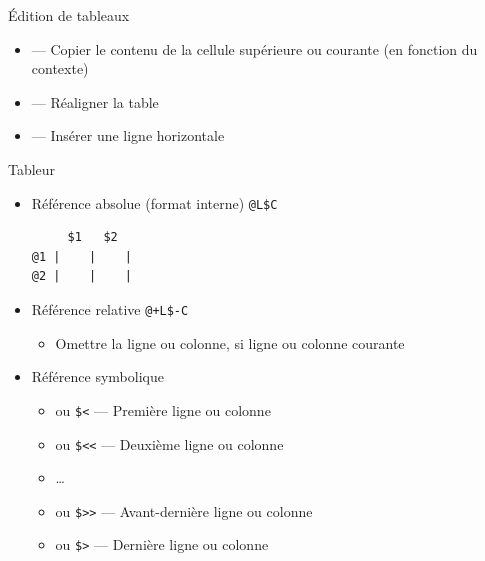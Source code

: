 \documentclass[presentation,t]{beamer}
\let\ORIkeys\keys
\renewcommand{\keys}[1]{\ORIkeys{\texttt{#1}}}
\begin{document}
\begin{frame}[label={sec:orgfe4f9b3}]{Édition de tableaux}
\begin{itemize}
\item \keys{S-RET} --- Copier le contenu de la cellule supérieure ou courante (en
fonction du contexte)
\item \keys{C-c C-c} --- Réaligner la table
\item \keys{C-c -} --- Insérer une ligne horizontale
\end{itemize}
\end{frame}

\begin{frame}[fragile,label={sec:orgc12b694}]{Tableur}
 \begin{itemize}
\item Référence absolue (format interne) \texttt{@L\$C}

\lstset{language=org,label= ,caption= ,captionpos=b,numbers=none}
\begin{lstlisting}
     $1   $2
@1 |    |    |
@2 |    |    |
\end{lstlisting}

\item Référence relative \texttt{@+L\$-C}
\begin{itemize}
\item Omettre la ligne ou colonne, si ligne ou colonne \alert{courante}
\end{itemize}

\item Référence symbolique
\begin{itemize}
\item \keys{@<} ou \texttt{\$<} --- Première ligne ou colonne
\item \keys{@<<} ou \texttt{\$<<} --- Deuxième ligne ou colonne
\item \ldots{}
\item \keys{@>>} ou \texttt{\$>>} --- Avant-dernière ligne ou colonne
\item \keys{@>} ou \texttt{\$>} --- Dernière ligne ou colonne
\end{itemize}
\end{itemize}
\end{frame}
\end{document}
